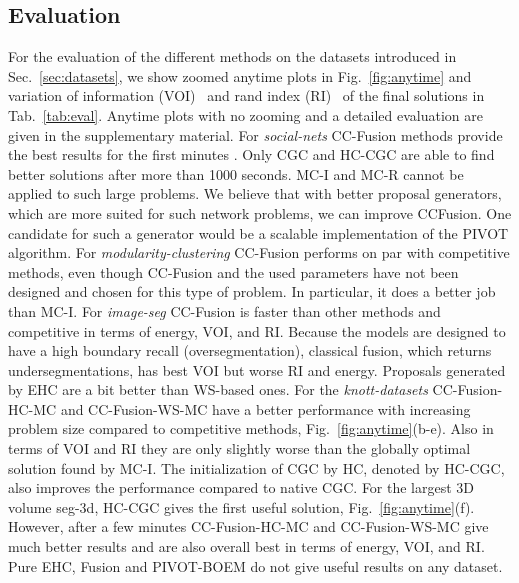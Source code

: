 \subsection{Evaluation}
For the evaluation of the different methods on the datasets introduced in Sec.~\ref{sec:datasets},
we show zoomed anytime plots in  Fig.~\ref{fig:anytime} and variation of information (VOI)~\cite{meila-2003}
and rand index (RI)~\cite{rand-1971} of the final solutions in Tab.~\ref{tab:eval}.
Anytime plots with no zooming and a detailed evaluation are given in the supplementary material. 
%
For \emph{social-nets} CC-Fusion methods provide the best results for the first minutes .
Only CGC and HC-CGC are able to find better solutions after more than 1000 seconds.
MC-I and MC-R cannot be applied to such large problems.
We believe that with better proposal generators, which are more suited for such network problems,
we can improve CCFusion. One candidate for such a generator would be a scalable implementation of the 
PIVOT algorithm.
%
For \emph{modularity-clustering} CC-Fusion performs on par with competitive methods, even though CC-Fusion 
and the used parameters have not been designed and chosen for this type of problem.
In particular, it does a better job than MC-I.
%
For \emph{image-seg} CC-Fusion is faster than other methods and competitive in terms of energy, VOI, and RI.
Because  the models are designed to have a high boundary recall (oversegmentation), 
classical fusion, which returns undersegmentations, has best VOI but worse RI and energy.
Proposals generated by EHC are a bit better than WS-based ones.
%
For the \emph{knott-datasets}
CC-Fusion-HC-MC and CC-Fusion-WS-MC have a better performance with increasing problem size compared to competitive methods, \cf Fig.~\ref{fig:anytime}(b-e).
Also in terms of VOI and RI they are only slightly worse than the globally optimal solution found by MC-I.
The initialization of CGC by HC, denoted by HC-CGC, also improves the performance compared to native CGC.
For the largest 3D volume seg-3d, HC-CGC gives the first useful solution, \cf  Fig.~\ref{fig:anytime}(f).
However, after a few minutes  CC-Fusion-HC-MC and CC-Fusion-WS-MC give much better results and are also overall best in terms of energy, VOI, and RI.
%
Pure EHC, Fusion and PIVOT-BOEM do not give useful results on any dataset.
